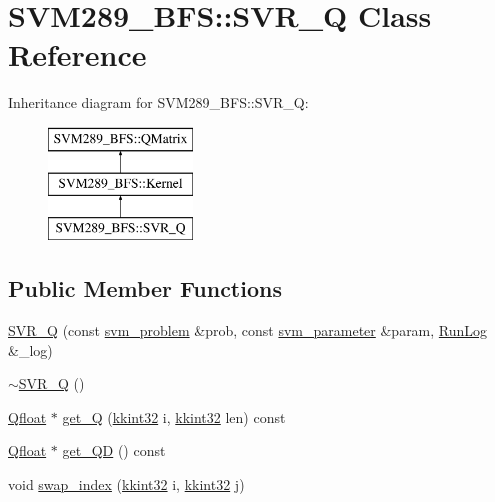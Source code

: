 \hypertarget{class_s_v_m289___b_f_s_1_1_s_v_r___q}{}\section{S\+V\+M289\+\_\+\+B\+FS\+:\+:S\+V\+R\+\_\+Q Class Reference}
\label{class_s_v_m289___b_f_s_1_1_s_v_r___q}
Inheritance diagram for S\+V\+M289\+\_\+\+B\+FS\+:\+:S\+V\+R\+\_\+Q\+:\begin{figure}[H]
\begin{center}
\leavevmode
\includegraphics[height=3.000000cm]{class_s_v_m289___b_f_s_1_1_s_v_r___q}
\end{center}
\end{figure}
\subsection*{Public Member Functions}
\begin{DoxyCompactItemize}
\item 
\hyperlink{class_s_v_m289___b_f_s_1_1_s_v_r___q_ad1f3dafa89425b9413fa17cf2cc85688}{S\+V\+R\+\_\+Q} (const \hyperlink{struct_s_v_m289___b_f_s_1_1svm__problem}{svm\+\_\+problem} \&prob, const \hyperlink{struct_s_v_m289___b_f_s_1_1svm__parameter}{svm\+\_\+parameter} \&param, \hyperlink{class_k_k_b_1_1_run_log}{Run\+Log} \&\+\_\+log)
\item 
\hyperlink{class_s_v_m289___b_f_s_1_1_s_v_r___q_ac797f1dbba201b264308b5d31e7d5403}{$\sim$\+S\+V\+R\+\_\+Q} ()
\item 
\hyperlink{namespace_s_v_m289___b_f_s_a8b0a7657dcefcb6e9a857c9b5e2fd2ef}{Qfloat} $\ast$ \hyperlink{class_s_v_m289___b_f_s_1_1_s_v_r___q_a80f9581a87fcade141aa121ae5150163}{get\+\_\+Q} (\hyperlink{namespace_k_k_b_a8fa4952cc84fda1de4bec1fbdd8d5b1b}{kkint32} i, \hyperlink{namespace_k_k_b_a8fa4952cc84fda1de4bec1fbdd8d5b1b}{kkint32} len) const 
\item 
\hyperlink{namespace_s_v_m289___b_f_s_a8b0a7657dcefcb6e9a857c9b5e2fd2ef}{Qfloat} $\ast$ \hyperlink{class_s_v_m289___b_f_s_1_1_s_v_r___q_a1c12666ee93dccbd4c9f03d62a405336}{get\+\_\+\+QD} () const 
\item 
void \hyperlink{class_s_v_m289___b_f_s_1_1_s_v_r___q_af59859cc6164180ac249b6e01ff309a7}{swap\+\_\+index} (\hyperlink{namespace_k_k_b_a8fa4952cc84fda1de4bec1fbdd8d5b1b}{kkint32} i, \hyperlink{namespace_k_k_b_a8fa4952cc84fda1de4bec1fbdd8d5b1b}{kkint32} j)
\end{DoxyCompactItemize}
